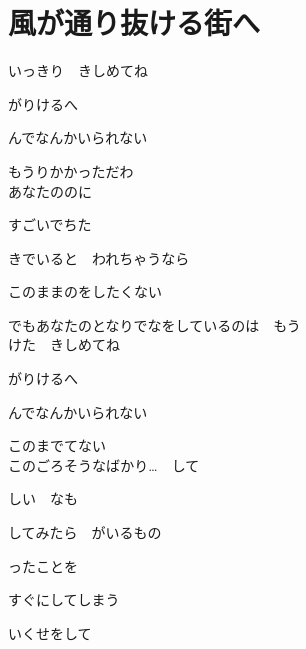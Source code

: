 \section{ 風が通り抜ける街へ}

\large{

いっきり　きしめてね

がりけるへ

んでなんかいられない　

もうりかかっただわ
\\

あなたののに　

すごいでちた

きでいると　われちゃうなら

このままのをしたくない

でもあなたのとなりでなをしているのは　もう
\\

けた　きしめてね

がりけるへ

んでなんかいられない　

このまでてない
\\

このごろそうなばかり…　して

しい　なも

してみたら　がいるもの

ったことを　

すぐにしてしまう　

いくせをして
\\


}
